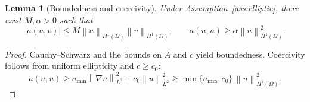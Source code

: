 \documentclass[10pt,a4paper]{amsart}
\newtheorem{lemma}{Lemma}
\newcommand{\norm}[1]{\left\lVert #1\right\rVert}
\begin{document}
\begin{lemma}[Boundedness and coercivity]\label{lem:coercive}
Under Assumption~\ref{ass:elliptic}, there exist $M,\alpha>0$ such that
\[
|a(u,v)|\le M\norm{u}_{H^1(\Omega)}\norm{v}_{H^1(\Omega)},\qquad
a(u,u)\ge \alpha\norm{u}_{H^1(\Omega)}^2.
\]
\end{lemma}

\begin{proof}
Cauchy--Schwarz and the bounds on $A$ and $c$ yield boundedness. Coercivity follows from uniform ellipticity and $c\ge c_0$:
\[
a(u,u)\ge a_{\min}\norm{\nabla u}_{L^2}^2+c_0\norm{u}_{L^2}^2
\ge \min\{a_{\min},c_0\}\,\norm{u}_{H^1(\Omega)}^2.
\]
\end{proof}
\end{document}
